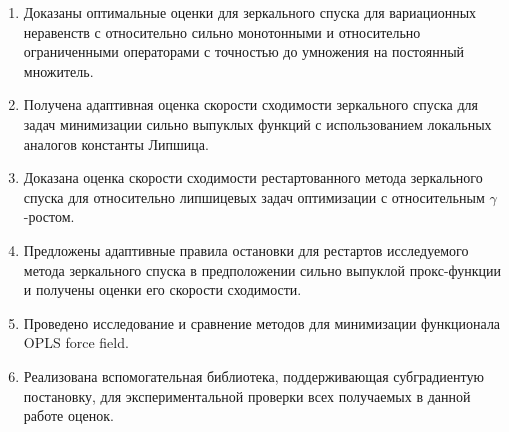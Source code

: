 \begin{enumerate}
  \item Доказаны оптимальные оценки для зеркального спуска для вариационных неравенств с относительно сильно монотонными и относительно ограниченными операторами с точностью до умножения на постоянный множитель.
  \item Получена адаптивная оценка скорости сходимости зеркального спуска для задач минимизации сильно выпуклых функций с использованием локальных аналогов константы Липшица. 
  \item Доказана оценка скорости сходимости рестартованного метода зеркального спуска для относительно липшицевых задач оптимизации с относительным $\gamma$-ростом. 
  \item Предложены адаптивные правила остановки для рестартов исследуемого метода зеркального спуска в предположении сильно выпуклой прокс-функции и получены оценки его скорости сходимости.
  \item Проведено исследование и сравнение методов для минимизации функционала OPLS force field.
  \item Реализована вспомогательная библиотека, поддерживающая субградиентую постановку, для экспериментальной проверки всех получаемых в данной работе оценок. 
\end{enumerate}

